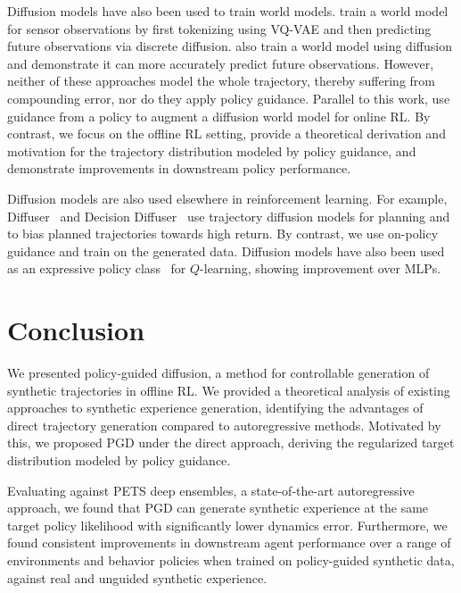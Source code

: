 \documentclass[10pt]{article} %
\theoremstyle{plain}
\theoremstyle{definition}
\theoremstyle{remark}
\begin{document}
Diffusion models have also been used to train world models. \citet{zhang2023learning} train a world model for sensor observations by first tokenizing using VQ-VAE and then predicting future observations via discrete diffusion. \citet{alonso2023diffusion} also train a world model using diffusion and demonstrate it can more accurately predict future observations. However, neither of these approaches model the whole trajectory, thereby suffering from compounding error, nor do they apply policy guidance.
Parallel to this work, \citet{rigter2023world} use guidance from a policy to augment a diffusion world model for online RL. By contrast, we focus on the offline RL setting, provide a theoretical derivation and motivation for the trajectory distribution modeled by policy guidance, and demonstrate improvements in downstream policy performance.

Diffusion models are also used elsewhere in reinforcement learning.
For example, Diffuser~\citep{janner2022diffuser} and Decision Diffuser~\citep{ajay2023is} use trajectory diffusion models for planning and to bias planned trajectories towards high return.
By contrast, we use on-policy guidance and train on the generated data.
Diffusion models have also been used as an expressive policy class~\citep{wang2023diffusion} for $Q$-learning, showing improvement over MLPs.



\section{Conclusion}
\label{conclusion}
We presented policy-guided diffusion, a method for controllable generation of synthetic trajectories in offline RL.
We provided a theoretical analysis of existing approaches to synthetic experience generation, identifying the advantages of direct trajectory generation compared to autoregressive methods.
Motivated by this, we proposed PGD under the direct approach, deriving the regularized target distribution modeled by policy guidance.

Evaluating against PETS deep ensembles, a state-of-the-art autoregressive approach, we found that PGD can generate synthetic experience at the same target policy likelihood with significantly lower dynamics error.
Furthermore, we found consistent improvements in downstream agent performance over a range of environments and behavior policies when trained on policy-guided synthetic data, against real and unguided synthetic experience.
\end{document}
